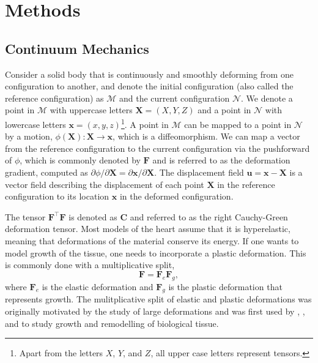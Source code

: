 \section{Methods}
\subsection{Continuum Mechanics}
Consider a solid body that is continuously and smoothly deforming from one configuration to another, and denote the initial configuration (also called the reference configuration) as $\mathcal{M}$ and the current configuration $\mathcal{N}$. We denote a point in $\mathcal{M}$ with uppercase letters $\mathbf{X} = (X, Y, Z)$ and a point in $\mathcal{N}$ with lowercase letters $\mathbf{x} = (x, y, z)$\footnote{Apart from the letters $X$, $Y$, and $Z$, all upper case letters represent tensors.}. A point in $\mathcal{M}$ can be mapped to a point in $\mathcal{N}$ by a motion, $\phi(\mathbf{X}): \mathbf{X} \rightarrow \mathbf{x}$, which is a diffeomorphism. We can map a vector from the reference configuration to the current configuration via the pushforward of $\phi$, which is commonly denoted by $\mathbf{F}$ and is referred to as the deformation gradient, computed as $\partial\phi/\partial\mathbf{X} = \partial\mathbf{x}/\partial\mathbf{X}$. The displacement field $\mathbf{u} = \mathbf{x} - \mathbf{X}$ is a vector field describing the displacement of each point $\mathbf{X}$ in the reference configuration to its location $\mathbf{x}$ in the deformed configuration. \par 
The tensor $\mathbf{F}^\top\mathbf{F}$ is denoted as $\mathbf{C}$ and referred to as the right Cauchy-Green deformation tensor. Most models of the heart assume that it is hyperelastic, meaning that deformations of the material conserve its energy. If one wants to model growth of the tissue, one needs to incorporate a plastic deformation. This is commonly done with a multiplicative split, 
\begin{equation}
\label{eq: multiplicative split}
    \mathbf{F} = \mathbf{F}_e\mathbf{F}_g,
\end{equation}
where $\mathbf{F}_e$ is the elastic deformation and $\mathbf{F}_g$ is the plastic deformation that represents growth. The mulitplicative split of elastic and plastic deformations was originally motivated by the study of large deformations and was first used by \citep{Kondaurov1987}, \citep{Takamizawa1990}, and \citep{Rodriguez1994} to study growth and remodelling of biological tissue. \par 
